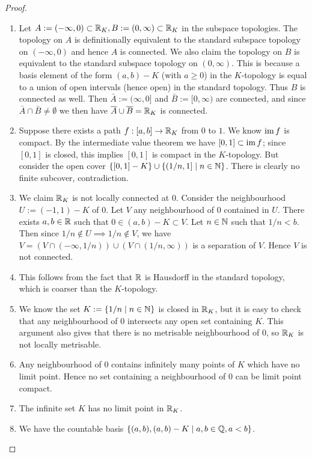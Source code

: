 \begin{proof}
  \begin{enumerate}[leftmargin=*]
  \item Let $A := (-\infty, 0) \subset \mathbb{R}_K, B := (0, \infty) \subset \mathbb{R}_K$ in the subspace topologies. The topology on $A$ is definitionally equivalent to the standard subspace topology on $(-\infty, 0)$ and hence $A$ is connected. We also claim the topology on $B$ is equivalent to the standard subspace topology on $(0, \infty)$. This is because a basis element of the form $(a, b) - K$ (with $a \ge 0$) in the $K$-topology is equal to a union of open intervals (hence open) in the standard topology. Thus $B$ is connected as well. Then $\bar A := (\infty, 0]$ and $\bar B := [0, \infty)$ are connected, and since $\bar A \cap \bar B \ne \emptyset$ we then have $\overline{A} \cup \overline{B} = \mathbb{R}_K$ is connected. 
  \item Suppose there exists a path $f : [a, b] \to \mathbb{R}_K$ from $0$ to $1$. We know $\operatorname{im} f$ is compact. By the intermediate value theorem we have $[0,1] \subset \operatorname{im} f$; since $[0,1]$ is closed, this implies $[0,1]$ is compact in the $K$-topology. But consider the open cover $\{[0,1] - K\} \cup \{(1/n, 1] \mid n \in \mathbb{N}\}$. There is clearly no finite subcover, contradiction. 
  \item We claim $\mathbb{R}_K$ is not locally connected at $0$. Consider the neighbourhood $U := (-1, 1) - K$ of $0$. Let $V$ any neighbourhood of $0$ contained in $U$. There exists $a,b \in \mathbb{R}$ such that $0 \in (a, b) - K \subset V$. Let $n \in \mathbb{N}$ such that $1/n < b$. Then since $1/n \notin U \implies 1/n \notin V$, we have $V = (V \cap (-\infty, 1/n)) \cup (V \cap (1/n, \infty))$ is a separation of $V$. Hence $V$ is not connected. 
  \item This follows from the fact that $\mathbb{R}$ is Hausdorff in the standard topology, which is coarser than the $K$-topology. 
  \item We know the set $K := \{1/n \mid n \in \mathbb{N}\}$ is closed in $\mathbb{R}_K$, but it is easy to check that any neighbourhood of $0$ intersects any open set containing $K$. This argument also gives that there is no metrisable neighbourhood of $0$, so $\mathbb{R}_K$ is not locally metrisable.
  \item Any neighbourhood of $0$ contains infinitely many points of $K$ which have no limit point. Hence no set containing a neighbourhood of $0$ can be limit point compact.
  \item The infinite set $K$ has no limit point in $\mathbb{R}_K$. 
  \item We have the countable basis $\{(a,b), (a,b) - K \mid a,b \in \mathbb{Q}, a < b\}$. \qedhere
  \end{enumerate}
\end{proof}

